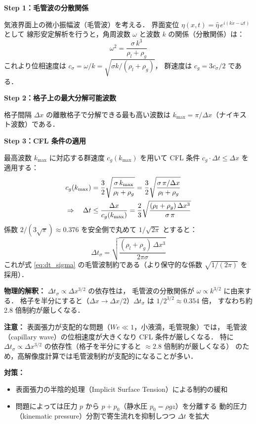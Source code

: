 \begin{tcolorbox}[defbox, title={毛管波制約の導出：分散関係から CFL 条件へ}]
\textbf{Step 1：毛管波の分散関係}

気液界面上の微小振幅波（毛管波）を考える．
界面変位 $\eta(x,t) = \hat{\eta}\,e^{i(kx - \omega t)}$ として
線形安定解析を行うと，角周波数 $\omega$ と波数 $k$ の関係（分散関係）は：
\begin{equation}
  \omega^2 = \frac{\sigma\,k^3}{\rho_l + \rho_g}
  \label{eq:capillary_dispersion}
\end{equation}
これより位相速度は $c_\sigma = \omega/k = \sqrt{\sigma k/(\rho_l+\rho_g)}$，
群速度は $c_g = 3c_\sigma/2$ である．

\textbf{Step 2：格子上の最大分解可能波数}

格子間隔 $\Delta x$ の離散格子で分解できる最も高い波数は
$k_{\max} = \pi/\Delta x$（ナイキスト波数）である．

\textbf{Step 3：CFL 条件の適用}

最高波数 $k_{\max}$ に対応する群速度 $c_g(k_{\max})$ を用いて
CFL 条件 $c_g \cdot \Delta t \le \Delta x$ を適用する：
\begin{align}
  c_g(k_{\max}) &= \frac{3}{2}\sqrt{\frac{\sigma\,k_{\max}}{\rho_l+\rho_g}}
  = \frac{3}{2}\sqrt{\frac{\sigma\,\pi/\Delta x}{\rho_l+\rho_g}} \notag\\
  \Rightarrow\quad
  \Delta t &\le \frac{\Delta x}{c_g(k_{\max})}
  = \frac{2}{3}\sqrt{\frac{(\rho_l+\rho_g)\,\Delta x^3}{\sigma\,\pi}}
  \label{eq:dt_sigma_derive}
\end{align}
係数 $2/(3\sqrt{\pi}) \approx 0.376$ を安全側で丸めて $1/\sqrt{2\pi}$ とすると：
\[
  \Delta t_\sigma = \sqrt{\frac{(\rho_l+\rho_g)\,\Delta x^3}{2\pi\sigma}}
\]
これが式 \eqref{eq:dt_sigma} の毛管波制約である（より保守的な係数 $\sqrt{1/(2\pi)}$ を採用）．

\textbf{物理的解釈：} $\Delta t_\sigma \propto \Delta x^{3/2}$ の依存性は，
毛管波の分散関係が $\omega \propto k^{3/2}$ に由来する．
格子を半分にすると（$\Delta x \to \Delta x/2$）$\Delta t_\sigma$ は $1/2^{3/2} \approx 0.354$ 倍，
すなわち約 2.8 倍制約が厳しくなる．
\end{tcolorbox}

\noindent\textbf{注意：}
表面張力が支配的な問題（$We \ll 1$，小液滴，毛管現象）では，
毛管波（capillary wave）の位相速度が大きくなり CFL 条件が厳しくなる．
特に $\Delta t_\sigma \propto \Delta x^{3/2}$ の依存性（格子を半分にすると $\approx 2.8$ 倍制約が厳しくなる）
のため，高解像度計算では毛管波制約が支配的になることが多い．

\textbf{対策：}
\begin{itemize}
  \item 表面張力の半陰的処理（Implicit Surface Tension）による制約の緩和
  \item 問題によっては圧力 $p$ から $p + p_0$（静水圧 $p_0 = \rho g z$）を分離する
        動的圧力（kinematic pressure）分割で寄生流れを抑制しつつ $\Delta t$ を拡大
\end{itemize}
